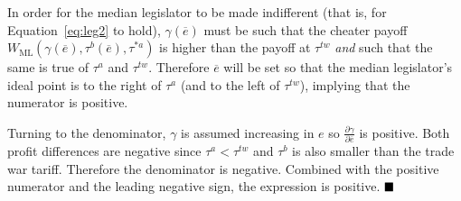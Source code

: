 \documentclass[12pt]{article}
\newcommand{\ov}{\overline}
\newcommand{\ga}{\gamma}
\begin{document}
\noindent In order for the median legislator to be made indifferent (that is, for Equation~\ref{eq:leg2} to hold), $\ga(\ov{e})$ must be such that the cheater payoff $W_\text{ML}(\ga(\ov{e}),\tau^b(\ov{e}),\tau^{*a})$ is higher than the payoff at $\tau^{tw}$ \textit{and} such that the same is true of $\tau^a$ and $\tau^{tw}$. Therefore $\ov{e}$ will be set so that the median legislator's ideal point is to the right of $\tau^a$ (and to the left of $\tau^{tw}$), implying that the numerator is positive.

Turning to the denominator, $\ga$ is assumed increasing in $e$ so $\frac{\partial \ga}{\partial \ov{e}}$ is positive. Both profit differences are negative since $\tau^a < \tau^{tw}$ and $\tau^b$ is also smaller than the trade war tariff. Therefore the denominator is negative. Combined with the positive numerator and the leading negative sign, the expression is positive. $\hfill\blacksquare$
\end{document}
